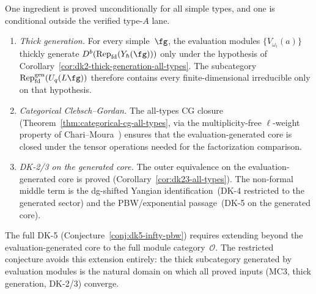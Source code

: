 \begin{remark}
\label{rem:restricted-dk5-inputs}
One ingredient is proved unconditionally for all simple types, and
one is conditional outside the verified type-$A$ lane.
\begin{enumerate}[label=\textup{(\roman*)}]
\item \emph{Thick generation.}
 For every simple~$\fg$, the evaluation modules
 $\{V_{\omega_i}(a)\}$ thickly generate
 $D^b(\mathrm{Rep}_{\mathrm{fd}}(Y_\hbar(\fg)))$
 only under the hypothesis of
 Corollary~\textup{\ref{cor:dk2-thick-generation-all-types}}.
 The subcategory
 $\operatorname{Rep}_{\mathrm{fd}}^{\mathrm{gen}}(U_q(L\fg))$
 therefore contains every finite-dimensional irreducible only on
 that hypothesis.
\item \emph{Categorical Clebsch--Gordan.}
 The all-types CG closure
 \textup{(}Theorem~\textup{\ref{thm:categorical-cg-all-types}},
 via the multiplicity-free $\ell$-weight property of
 Chari--Moura~\cite{ChariMoura06}\textup{)} ensures that
 the evaluation-generated core is closed under the tensor
 operations needed for the factorization comparison.
\item \emph{DK-2/3 on the generated core.}
 The outer equivalence on the evaluation-generated core is
 proved
 \textup{(}Corollary~\textup{\ref{cor:dk23-all-types}}\textup{)}.
 The non-formal middle term is the dg-shifted Yangian
 identification~\textup{(}DK-4 restricted to the generated
 sector\textup{)} and the PBW/exponential
 passage~\textup{(}DK-5 on the generated core\textup{)}.
\end{enumerate}
The full DK-5 \textup{(}Conjecture~\textup{\ref{conj:dk5-infty-pbw}}\textup{)}
requires extending beyond the evaluation-generated core to the full
module category~$\mathcal{O}$. The restricted conjecture avoids
this extension entirely: the thick subcategory generated by
evaluation modules is the natural domain on which all proved inputs
\textup{(}MC3, thick generation, DK-2/3\textup{)} converge.
\end{remark}

